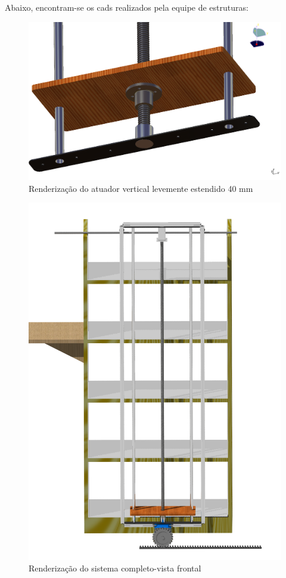 Abaixo, encontram-se os cads realizados pela equipe de estruturas:
\begin{figure}[!h]		
\centering 
\includegraphics[scale=0.4]{figuras/screen_2}
\caption{Renderização do atuador vertical levemente estendido 40 mm}
\end{figure}
\FloatBarrier

\begin{figure}[!h]		
\centering
\includegraphics[scale=0.1]{figuras/render_frente}
\caption{Renderização do sistema completo-vista frontal}
\end{figure}
\FloatBarrier


